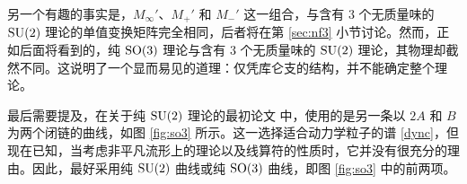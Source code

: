 另一个有趣的事实是，$M_\infty'$、$M_+'$ 和 $M_-'$ 这一组合，与含有 $3$ 个无质量味的 $\mathop{\mathrm{SU}}(2)$ 理论的单值变换矩阵完全相同，后者将在第 \ref{sec:nf3} 小节讨论。然而，正如后面将看到的，纯 $\mathop{\mathrm{SO}}(3)$ 理论与含有 $3$ 个无质量味的 $\mathop{\mathrm{SU}}(2)$ 理论，其物理却截然不同。这说明了一个显而易见的道理：仅凭库仑支的结构，并不能确定整个理论。

最后需要提及，在关于纯 $\mathop{\mathrm{SU}}(2)$ 理论的最初论文 \cite{Seiberg:1994rs} 中，使用的是另一条以 $2A$ 和 $B$ 为两个闭链的曲线，如图 \ref{fig:so3} 所示。这一选择适合动力学粒子的谱 \eqref{dync}，但现在已知，当考虑非平凡流形上的理论以及线算符的性质时，它并没有很充分的理由。因此，最好采用纯 $\mathop{\mathrm{SU}}(2)$ 曲线或纯 $\mathop{\mathrm{SO}}(3)$ 曲线，即图 \ref{fig:so3} 中的前两项。
